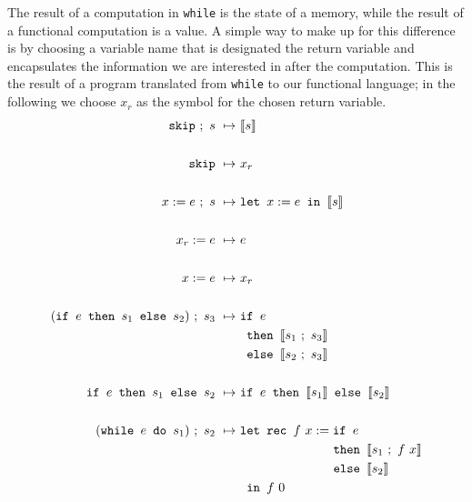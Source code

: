 \documentclass[11pt, leqno, titlepage]{article}
\theoremstyle{definition}
\begin{document}
The result of a computation in \texttt{while} is the state of a memory, while the
result of a functional computation is a value. A simple way to make up for this
difference is by choosing a variable name that is designated the return variable and
encapsulates the information we are interested in after the computation. This is the
result of a program translated from \texttt{while} to our functional language; in the
following we choose $x_r$ as the symbol for the chosen return variable. 
\begin{align}
  \texttt{skip}~;~s ~\mapsto~ & \llbracket s \rrbracket\\
                                \notag\\
  \texttt{skip}     ~\mapsto~ & x_r\\
                                \notag\\
  x := e~;~s        ~\mapsto~ & \texttt{let } x := e \texttt{ in }\llbracket s \rrbracket\\
                                \notag\\
  x_r := e          ~\mapsto~ & e \\
                                \notag\\
  x := e            ~\mapsto~ & x_r\\
                                \notag\\
  (\texttt{if } e \texttt{ then } s_1 \texttt{ else } s_2) ~;~s_3
                    ~\mapsto~ & \texttt{if } e \\
                    &  \texttt{ then } \llbracket s_1 ~;~ s_3 \rrbracket\notag\\
                    & \texttt{ else } \llbracket s_2 ~;~ s_3 \rrbracket \notag\\
  \notag\\
  \texttt{if } e \texttt{ then } s_1 \texttt{ else } s_2
                    ~\mapsto~ & \texttt{if } e
                                  \texttt{ then } \llbracket s_1 \rrbracket
                                  \texttt{ else } \llbracket s_2 \rrbracket \\
  \notag\\
  (\texttt{while } e \texttt{ do } s_1) ~;~ s_2
                    ~\mapsto~ & \texttt{let rec } f~x :=
                                  \texttt{if } e \label{eq:while1}\\
                    & \phantom{{}=11111111111} \texttt{ then } \llbracket s_1 ~;~ f~x \rrbracket \notag\\
                    &\phantom{{}=11111111111}\texttt{ else } \llbracket s_2 \rrbracket\notag\\
                    & \texttt{ in } f~0 \notag 
\end{align}
\end{document}
